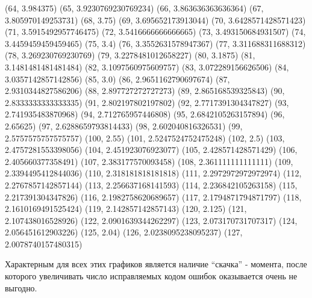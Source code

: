 \documentclass[12pt]{article}
\begin{document}
{                (64, 3.984375)
                (65, 3.9230769230769234)
                (66, 3.863636363636364)
                (67, 3.805970149253731)
                (68, 3.75)
                (69, 3.695652173913044)
                (70, 3.6428571428571423)
                (71, 3.5915492957746475)
                (72, 3.5416666666666665)
                (73, 3.493150684931507)
                (74, 3.4459459459459465)
                (75, 3.4)
                (76, 3.3552631578947367)
                (77, 3.311688311688312)
                (78, 3.269230769230769)
                (79, 3.2278481012658227)
                (80, 3.1875)
                (81, 3.1481481481481484)
                (82, 3.1097560975609757)
                (83, 3.072289156626506)
                (84, 3.0357142857142856)
                (85, 3.0)
                (86, 2.9651162790697674)
                (87, 2.9310344827586206)
                (88, 2.897727272727273)
                (89, 2.865168539325843)
                (90, 2.8333333333333335)
                (91, 2.802197802197802)
                (92, 2.7717391304347827)
                (93, 2.741935483870968)
                (94, 2.712765957446808)
                (95, 2.6842105263157894)
                (96, 2.65625)
                (97, 2.6288659793814433)
                (98, 2.602040816326531)
                (99, 2.5757575757575757)
                (100, 2.55)
                (101, 2.5247524752475248)
                (102, 2.5)
                (103, 2.4757281553398056)
                (104, 2.451923076923077)
                (105, 2.428571428571429)
                (106, 2.405660377358491)
                (107, 2.383177570093458)
                (108, 2.361111111111111)
                (109, 2.3394495412844036)
                (110, 2.318181818181818)
                (111, 2.2972972972972974)
                (112, 2.2767857142857144)
                (113, 2.256637168141593)
                (114, 2.236842105263158)
                (115, 2.217391304347826)
                (116, 2.1982758620689657)
                (117, 2.1794871794871797)
                (118, 2.1610169491525424)
                (119, 2.142857142857143)
                (120, 2.125)
                (121, 2.107438016528926)
                (122, 2.0901639344262297)
                (123, 2.073170731707317)
                (124, 2.056451612903226)
                (125, 2.04)
                (126, 2.0238095238095237)
                (127, 2.0078740157480315)
            }

            Характерным для всех этих графиков является наличие ``скачка'' - момента, после которого увеличивать число исправляемых кодом ошибок оказывается очень не выгодно. \\
\end{document}

